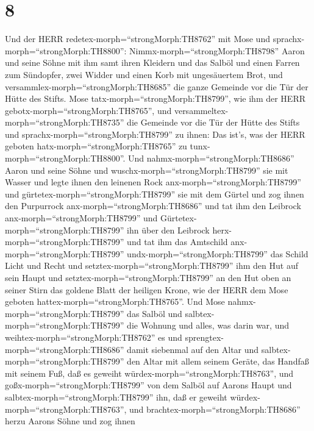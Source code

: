 \hypertarget{section-7}{%
\section{8}\label{section-7}}

 Und der HERR redetex-morph=``strongMorph:TH8762'' mit Mose
und sprachx-morph=``strongMorph:TH8800'': 
Nimmx-morph=``strongMorph:TH8798'' Aaron und seine Söhne mit ihm samt
ihren Kleidern und das Salböl und einen Farren zum Sündopfer, zwei
Widder und einen Korb mit ungesäuertem Brot,  und
versammlex-morph=``strongMorph:TH8685'' die ganze Gemeinde vor die Tür
der Hütte des Stifts.  Mose
tatx-morph=``strongMorph:TH8799'', wie ihm der HERR
gebotx-morph=``strongMorph:TH8765'', und
versammeltex-morph=``strongMorph:TH8735'' die Gemeinde vor die Tür der
Hütte des Stifts  und sprachx-morph=``strongMorph:TH8799''
zu ihnen: Das ist's, was der HERR geboten
hatx-morph=``strongMorph:TH8765'' zu tunx-morph=``strongMorph:TH8800''.
 Und nahmx-morph=``strongMorph:TH8686'' Aaron und seine
Söhne und wuschx-morph=``strongMorph:TH8799'' sie mit Wasser
 und legte ihnen den leinenen Rock
anx-morph=``strongMorph:TH8799'' und
gürtetex-morph=``strongMorph:TH8799'' sie mit dem Gürtel und zog ihnen
den Purpurrock anx-morph=``strongMorph:TH8686'' und tat ihm den Leibrock
anx-morph=``strongMorph:TH8799'' und
Gürtetex-morph=``strongMorph:TH8799'' ihn über den Leibrock
herx-morph=``strongMorph:TH8799''  und tat ihm das Amtschild
anx-morph=``strongMorph:TH8799'' undx-morph=``strongMorph:TH8799'' das
Schild Licht und Recht  und
setztex-morph=``strongMorph:TH8799'' ihm den Hut auf sein Haupt und
setztex-morph=``strongMorph:TH8799'' an den Hut oben an seiner Stirn das
goldene Blatt der heiligen Krone, wie der HERR dem Mose geboten
hattex-morph=``strongMorph:TH8765''.  Und Mose
nahmx-morph=``strongMorph:TH8799'' das Salböl und
salbtex-morph=``strongMorph:TH8799'' die Wohnung und alles, was darin
war, und weihtex-morph=``strongMorph:TH8762'' es  und
sprengtex-morph=``strongMorph:TH8686'' damit siebenmal auf den Altar und
salbtex-morph=``strongMorph:TH8799'' den Altar mit allem seinem Geräte,
das Handfaß mit seinem Fuß, daß es geweiht
würdex-morph=``strongMorph:TH8763'',  und
goßx-morph=``strongMorph:TH8799'' von dem Salböl auf Aarons Haupt und
salbtex-morph=``strongMorph:TH8799'' ihn, daß er geweiht
würdex-morph=``strongMorph:TH8763'',  und
brachtex-morph=``strongMorph:TH8686'' herzu Aarons Söhne und zog ihnen

